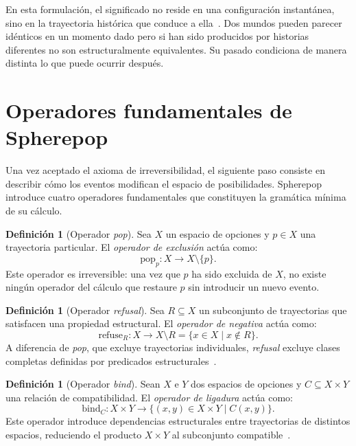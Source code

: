 \documentclass[12pt]{article}
\theoremstyle{plain}
\theoremstyle{definition}
\newtheorem{definition}[theorem]{Definición}
\begin{document}
En esta formulación, el significado no reside en una configuración instantánea, sino en la trayectoria histórica que conduce a ella~\cite{whitehead,heidegger}. Dos mundos pueden parecer idénticos en un momento dado pero si han sido producidos por historias diferentes no son estructuralmente equivalentes. Su pasado condiciona de manera distinta lo que puede ocurrir después.

\section{Operadores fundamentales de Spherepop}
\label{sec:operadores}

Una vez aceptado el axioma de irreversibilidad, el siguiente paso consiste en describir cómo los eventos modifican el espacio de posibilidades. Spherepop introduce cuatro operadores fundamentales que constituyen la gramática mínima de su cálculo.

\begin{definition}[Operador \emph{pop}]
\label{def:pop}
Sea $X$ un espacio de opciones y $p \in X$ una trayectoria particular. El \emph{operador de exclusión} actúa como:
\[
\mathrm{pop}_p : X \longrightarrow X \setminus \{p\}.
\]
Este operador es irreversible: una vez que $p$ ha sido excluida de $X$, no existe ningún operador del cálculo que restaure $p$ sin introducir un nuevo evento.
\end{definition}

\begin{definition}[Operador \emph{refusal}]
\label{def:refuse}
Sea $R \subseteq X$ un subconjunto de trayectorias que satisfacen una propiedad estructural. El \emph{operador de negativa} actúa como:
\[
\mathrm{refuse}_R : X \longrightarrow X \setminus R = \{x \in X \mid x \notin R\}.
\]
A diferencia de \emph{pop}, que excluye trayectorias individuales, \emph{refusal} excluye clases completas definidas por predicados estructurales~\cite{girard}.
\end{definition}

\begin{definition}[Operador \emph{bind}]
\label{def:bind}
Sean $X$ e $Y$ dos espacios de opciones y $C \subseteq X \times Y$ una relación de compatibilidad. El \emph{operador de ligadura} actúa como:
\[
\mathrm{bind}_C : X \times Y \longrightarrow \{(x,y) \in X \times Y \mid C(x,y)\}.
\]
Este operador introduce dependencias estructurales entre trayectorias de distintos espacios, reduciendo el producto $X \times Y$ al subconjunto compatible~\cite{maclane,girard}.
\end{definition}
\end{document}
